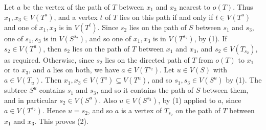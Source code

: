 {Let $a$ be the vertex of the path of $T$ between $x_1$ and $x_3$ nearest to $o(T)$. Thus
$x_1, x_3 \in V(T^a)$, and a vertex $t$ of $T$ lies on this path if and only if $t \in V(T^a)$ and
one of $x_1, x_3$ is in $V(T^t)$. Since $s_2$ lies on the path of $S$ between $s_1$ and $s_3$, one
of $s_1, s_3$ is in $V(S^{s_2})$, and so one of $x_1, x_3$ is in $V(T^{s_2})$, by (1). If
$s_2 \in V(T^a)$, then $s_2$ lies on the path of $T$ between $x_1$ and $x_3$, and
$s_2 \in V(T_{s_2})$, as required. Otherwise, since $s_2$ lies on the directed path of $T$ from
$o(T)$ to $x_1$ or to $x_3$, and $a$ lies on both, we have $a \in V(T^{s_2})$. Let
$u \in V(S)$ with $a \in V(T_u)$. Then $x_1, x_3 \in V(T^a) \subseteq V(T^u)$, and so
$s_1, s_3 \in V(S^u)$ by (1). The subtree $S^u$ contains $s_1$ and $s_3$, and so it contains the
path of $S$ between them, and in particular $s_2 \in V(S^u)$. Also $u \in V(S^{s_2})$, by (1) applied to $a$, since
$a \in V(T^{s_2})$. Hence $u = s_2$, and so $a$ is a vertex of $T_{s_2}$ on the path of $T$ between
$x_1$ and $x_3$. This proves (2).

}
